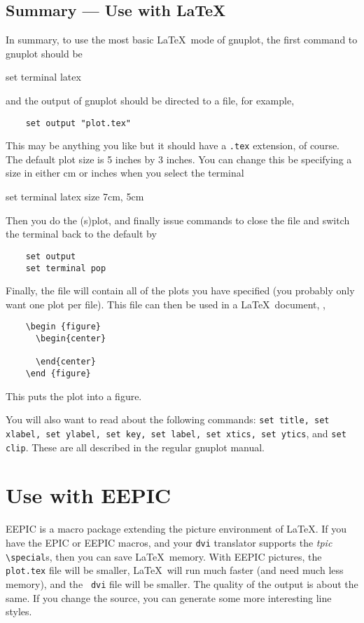 \subsection{Summary --- Use with \LaTeX}
In summary, to use the most basic \LaTeX\ mode of gnuplot, the first
command to gnuplot should be
\begin{syntax}
    set terminal latex
\end{syntax}
and the output of gnuplot should be directed to a file, for example,
\begin{verbatim}
    set output "plot.tex"
\end{verbatim}
This may be anything you like but it should have a {\tt .tex} extension,
of course. The default plot size is 5 inches by 3 inches.
You can change this be specifying a size in either cm or inches when 
you select the terminal
\begin{syntax}
    set terminal latex size 7cm, 5cm
\end{syntax}


Then you do the (s)plot, and finally issue commands to close the file and
switch the terminal back to the default by
\begin{verbatim}
    set output
    set terminal pop
\end{verbatim}

Finally, the file will contain all of the plots you have
specified (you probably only want one plot per file). This file can
then be used in a \LaTeX\ document, \eg,

\singlespace
\begin{verbatim}
    \begin {figure}
      \begin{center}
        
      \end{center}
    \end {figure}
\end{verbatim}
\currentspace
This puts the plot into a figure.

You will also want to read about the following commands: {\tt set
title, set xlabel, set ylabel, set key, set label, set xtics, set
ytics}, and {\tt set clip}.  These are all described in the regular
gnuplot manual.

\section{Use with EEPIC}
\label{s:eepic}
EEPIC is a macro package extending the picture environment of \LaTeX.
If you have the EPIC or EEPIC macros, and your {\tt dvi} translator
supports the {\em tpic\/} \verb+\special+s, then you can save \LaTeX\
memory.  With EEPIC pictures, the {\tt plot.tex} file will be smaller,
\LaTeX\ will run much faster (and need much less memory), and the {\tt
dvi} file will be smaller. The quality of the output is about the
same. If you change the source, you can generate some more interesting
line styles.

